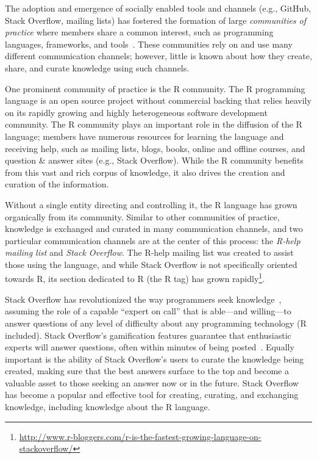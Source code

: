 \documentclass[smallextended]{svjour3}       %
\newcommand{\channels}{communication channels\xspace}
\newcommand{\SO}{Stack Overflow\xspace}
\newcommand{\RH}{R-help\xspace}
\begin{document}
The adoption and emergence of socially enabled tools and channels
(e.g., GitHub, \SO, mailing lists) has fostered the formation of large
\textit{communities of practice} where members share a common
interest, such as programming languages, frameworks, and
tools~\cite{Storey2014}. These communities rely on and use many
different communication channels; however, little is known about how
they create, share, and curate knowledge using such channels.

One prominent community of practice is the R community. The R
programming language is an open source project without commercial
backing that relies heavily on its rapidly growing and highly
heterogeneous software development community. The R community plays an
important role in the diffusion of the R language; members have
numerous resources for learning the language and receiving help, such
as mailing lists, blogs, books, online and offline courses, and
question \& answer sites (e.g., \SO). While the R community benefits
from this vast and rich corpus of knowledge, it also drives the
creation and curation of the information.

Without a single entity directing and controlling it, the R language has grown organically from its community. Similar to other communities of practice, knowledge is exchanged and curated in many \channels, and two particular \channels are at the center of this process: the \textit{\RH mailing list} and \textit{\SO}. The \RH mailing list was created to assist those using the language, and while \SO is not specifically oriented towards R, its section dedicated to R (the R tag) has grown rapidly\footnote{\href{http://www.r-bloggers.com/r-is-the-fastest-growing-language-on-stackoverflow/}{http://www.r-bloggers.com/r-is-the-fastest-growing-language-on-stackoverflow/}}.

\SO has revolutionized the way programmers seek knowledge~\cite{li2013help,Vasilescu2014c}, assuming the role of a capable ``expert on call'' that is able---and willing---to answer questions of any level of difficulty about any programming technology (R included). \SO's gamification features guarantee that enthusiastic experts will answer questions, often within minutes of being posted~\cite{Mamykina2011}. Equally important is the ability of \SO's users to curate the knowledge being created, making sure that the best answers surface to the top and become a valuable asset to those seeking an answer now or in the future. \SO has become a popular and effective tool for creating, curating, and exchanging knowledge, including knowledge about the R language.
\end{document}
